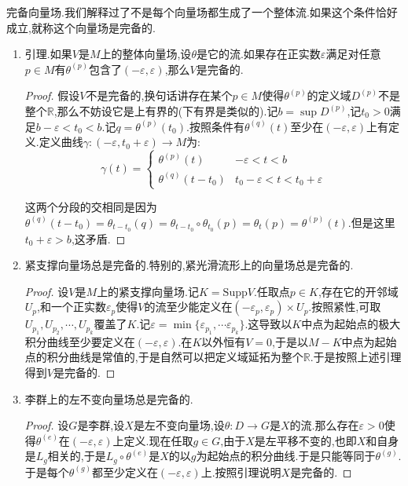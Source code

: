 完备向量场.我们解释过了不是每个向量场都生成了一个整体流.如果这个条件恰好成立,就称这个向量场是完备的.
\begin{enumerate}
	\item 引理.如果$V$是$M$上的整体向量场,设$\theta$是它的流.如果存在正实数$\varepsilon$满足对任意$p\in M$有$\theta^{(p)}$包含了$(-\varepsilon,\varepsilon)$,那么$V$是完备的.
	\begin{proof}
		
		假设$V$不是完备的,换句话讲存在某个$p\in M$使得$\theta^{(p)}$的定义域$D^{(p)}$不是整个$\mathbb{R}$,那么不妨设它是上有界的(下有界是类似的).记$b=\sup D^{(p)}$,记$t_0>0$满足$b-\varepsilon<t_0<b$.记$q=\theta^{(p)}(t_0)$.按照条件有$\theta^{(q)}(t)$至少在$(-\varepsilon,\varepsilon)$上有定义.定义曲线$\gamma:(-\varepsilon,t_0+\varepsilon)\to M$为:
		$$\gamma(t)=\left\{\begin{array}{cc}\theta^{(p)}(t)&-\varepsilon<t<b\\\theta^{(q)}(t-t_0)&t_0-\varepsilon<t<t_0+\varepsilon\end{array}\right.$$
		
		这两个分段的交相同是因为$\theta^{(q)}(t-t_0)=\theta_{t-t_0}(q)=\theta_{t-t_0}\circ\theta_{t_0}(p)=\theta_t(p)=\theta^{(p)}(t)$.但是这里$t_0+\varepsilon>b$,这矛盾.
	\end{proof}
	\item 紧支撑向量场总是完备的.特别的,紧光滑流形上的向量场总是完备的.
	\begin{proof}
		
		设$V$是$M$上的紧支撑向量场.记$K=\mathrm{Supp}V$.任取点$p\in K$,存在它的开邻域$U_p$,和一个正实数$\varepsilon_p$使得$V$的流至少能定义在$(-\varepsilon_p,\varepsilon_p)\times U_p$.按照紧性,可取$U_{p_1},U_{p_2},\cdots,U_{p_k}$覆盖了$K$.记$\varepsilon=\min\{\varepsilon_{p_1},\cdots\varepsilon_{p_k}\}$.这导致以$K$中点为起始点的极大积分曲线至少要定义在$(-\varepsilon,\varepsilon)$.在$K$以外恒有$V=0$,于是以$M-K$中点为起始点的积分曲线是常值的,于是自然可以把定义域延拓为整个$\mathbb{R}$.于是按照上述引理得到$V$是完备的.
	\end{proof}
	\item 李群上的左不变向量场总是完备的.
	\begin{proof}
		
		设$G$是李群,设$X$是左不变向量场,设$\theta:D\to G$是$X$的流.那么存在$\varepsilon>0$使得$\theta^{(e)}$在$(-\varepsilon,\varepsilon)$上定义.现在任取$g\in G$,由于$X$是左平移不变的,也即$X$和自身是$L_g$相关的,于是$L_g\circ\theta^{(e)}$是$X$的以$g$为起始点的积分曲线.于是只能等同于$\theta^{(g)}$.于是每个$\theta^{(g)}$都至少定义在$(-\varepsilon,\varepsilon)$上.按照引理说明$X$是完备的.
	\end{proof}
\end{enumerate}

